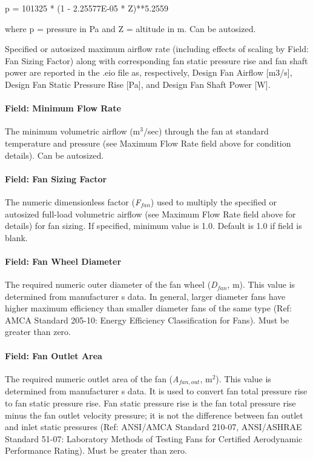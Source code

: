 p = 101325 * (1 - 2.25577E-05 * Z)**5.2559

where p = pressure in Pa and Z = altitude in m. Can be autosized.

Specified or autosized maximum airflow rate (including effects of scaling by Field: Fan Sizing Factor) along with corresponding fan static pressure rise and fan shaft power are reported in the .eio file as, respectively, Design Fan Airflow {[}m3/s{]}, Design Fan Static Pressure Rise {[}Pa{]}, and Design Fan Shaft Power {[}W{]}.

\paragraph{Field: Minimum Flow Rate}\label{field-minimum-flow-rate}

The minimum volumetric airflow (m\(^{3}\)/sec) through the fan at standard temperature and pressure (see Maximum Flow Rate field above for condition details). Can be autosized.

\paragraph{Field: Fan Sizing Factor}\label{field-fan-sizing-factor}

The numeric dimensionless factor (\emph{F\(_{fan}\)}) used to multiply the specified or autosized full-load volumetric airflow (see Maximum Flow Rate field above for details) for fan sizing. If specified, minimum value is 1.0. Default is 1.0 if field is blank.

\paragraph{Field: Fan Wheel Diameter}\label{field-fan-wheel-diameter}

The required numeric outer diameter of the fan wheel (\emph{D\(_{fan}\)}, m). This value is determined from manufacturer s data. In general, larger diameter fans have higher maximum efficiency than smaller diameter fans of the same type (Ref: AMCA Standard 205-10: Energy Efficiency Classification for Fans). Must be greater than zero.

\paragraph{Field: Fan Outlet Area}\label{field-fan-outlet-area}

The required numeric outlet area of the fan (\emph{A\(_{fan,out}\)}, m\(^{2}\)). This value is determined from manufacturer s data. It is used to convert fan total pressure rise to fan static pressure rise. Fan static pressure rise is the fan total pressure rise minus the fan outlet velocity pressure; it is not the difference between fan outlet and inlet static pressures (Ref: ANSI/AMCA Standard 210-07, ANSI/ASHRAE Standard 51-07: Laboratory Methods of Testing Fans for Certified Aerodynamic Performance Rating). Must be greater than zero.

